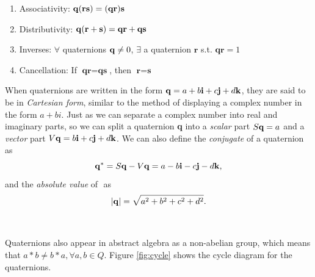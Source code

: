 \begin{thm}
\label{thm:mult}
\begin{enumerate} \textit{Properties of Quaternion Multiplication}
	\item Associativity: $\text{\textbf{q}} ( \textbf{r} \textbf{s}) = (\textbf{q} \textbf{r}) \textbf{s}$
	\item Distributivity: $\text{\textbf{q}} (\textbf{r} + \textbf{s}) = \textbf{q} \textbf{r} + \textbf{q} \textbf{s}$
	\item Inverses: $\forall$ quaternions $\text{\textbf{q}} \neq 0$, $\exists$ a quaternion $\textbf{r}$ s.t. $\textbf{qr} = 1$
	\item Cancellation: If $\textbf{qr}=\textbf{qs}$, then $\textbf{r} = \textbf{s}$
\end{enumerate}

\end{thm}

\noindent When quaternions are written in the form $\text{\textbf{q}} = a + b\text{\textbf{i}} + c\text{\textbf{j}} + d\text{\textbf{k}}$, they are said to be in \textit{Cartesian form}, similar to the method of displaying a complex number in the form $a + bi$.
Just as we can separate a complex number into real and imaginary parts, so we can split a quaternion \textbf{q} into a \textit{scalar} part $S\text{\textbf{q}} = a$ and a \textit{vector} part $V\text{\textbf{q}} = b\text{\textbf{i}} + c\text{\textbf{j}} + d\text{\textbf{k}}$.
We can also define the \textit{conjugate} of a quaternion as $$ \text{\textbf{q}}^* = S\text{\textbf{q}} - V\text{\textbf{q}} = a - b\text{\textbf{i}} - c\text{\textbf{j}} - d\text{\textbf{k}},$$ and the \textit{absolute value} of \qq$ $ as $$ \lvert\text{\textbf{q}}\rvert = \sqrt{a^2 + b^2 + c^2 + d^2}.$$
\\ \\
\noindent Quaternions also appear in abstract algebra as a non-abelian group, which means that $a * b \neq b * a, \forall a,b \in Q$. \cite{elements}
Figure \ref{fig:cycle} shows the cycle diagram for the quaternions.

